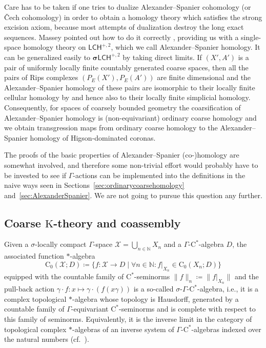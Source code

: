 \documentclass[pdftex]{sigma}
\numberwithin{equation}{section}
\theoremstyle{definition}
\newcommand{\N}{\mathbb{N}}
\newcommand{\cX}{\mathcal{X}}
\newcommand{\Ct}{\mathrm{C}}
\newcommand{\Cz}{\Ct_0}
\newcommand{\categoryfont}[1]{\mathsf{#1}}
\newcommand{\sLCHzp}[1][\Gamma]{\boldsymbol\sigma\categoryfont{LCH}_{#1}^{+,2}}
\newcommand{\LCHzp}[1][\Gamma]{\categoryfont{LCH}_{#1}^{+,2}}
\newcommand{\K}{\mathrm{K}}
\newcommand{\textCstar}{\ensuremath{\mathrm{C}^*\!}}
\begin{document}
Care has to be taken if one tries to dualize Alexander--Spanier cohomology (or \v{C}ech coho\-mo\-logy) in order to obtain a homology theory which satisfies the strong excision axiom, because most attempts of dualization destroy the long exact sequences. Massey pointed out how to do it correctly \cite{MasseyHomologyCohomologyBook,MasseyHowTo}, providing us with a single-space homology theory on $\LCHzp[]$, which we call Alexander--Spanier homology. It can be generalized easily to $\sLCHzp[]$ by taking direct limits.
If $(X',A')$ is a pair of uniformly locally finite countably generated coarse spaces, then all the pairs of Rips complexes $(P_E(X'),P_E(A'))$ are finite dimensional and the Alexander--Spanier homology of these pairs are isomorphic to their locally finite cellular homology by \cite[Section~4.9(4)]{MasseyHomologyCohomologyBook} and hence also to their locally finite simplicial homology. Consequently, for spaces of coarsely bounded geometry the coarsification of Alexander--Spanier homology is (non-equivariant) ordinary coarse homology and we obtain transgression maps from ordinary coarse homology to the Alexander--Spanier homology of Higson-dominated coronas.

The proofs of the basic properties of Alexander--Spanier \mbox{(co-)}homology are somewhat involved, and therefore some non-trivial effort would probably have to be invested to see if $\Gamma$-actions can be implemented into the definitions in the naive ways seen in Sections~\ref{sec:ordinarycoarsehomology} and~\ref{sec:AlexanderSpanier}. We are not going to pursue this question any further.

\subsection[Coarse K-theory and coassembly]{Coarse $\boldsymbol{\K}$-theory and coassembly}\label{sec:coassembly}

Given a $\sigma$-locally compact $\Gamma$-space $\cX=\bigcup_{n\in\N}X_n$ and a $\Gamma$-\textCstar-algebra $D$, the associated function $*$-algebra
\[
\Cz(\cX;D)\coloneqq \{f\colon\cX\to D\mid \forall n\in\N\colon f|_{X_n}\in\Cz(X_n;D)\}
\]
equipped with the countable family of \textCstar-seminorms $\|f\|_n\coloneqq\|f|_{X_n}\|$ and the pull-back action $\gamma\cdot f\colon x\mapsto \gamma\cdot (f(x\gamma))$ is a so-called $\sigma$-$\Gamma$-\textCstar-algebra, i.e., it is a complex topological $*$-algebra whose topology is Hausdorff, generated by a countable family of $\Gamma$-equivariant \textCstar-seminorms and is complete with respect to this family of seminorms. Equivalently, it is the inverse limit in the category of topological complex $*$-algebras of an inverse system of $\Gamma$-\textCstar-algebras indexed over the natural numbers (cf.\ \cite{PhiInv}).
\end{document}
